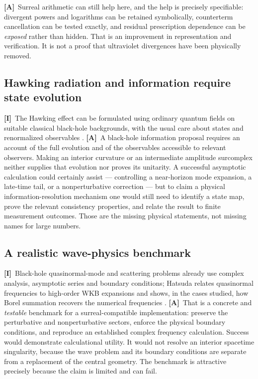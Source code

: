 \documentclass[11pt,letterpaper]{article}
\numberwithin{equation}{section}
\theoremstyle{definition}
\theoremstyle{remark}
\newcommand{\TA}{\textcolor{TierA}{\textsf{\bfseries[A]}}}
\newcommand{\TI}{\textcolor{TierI}{\textsf{\bfseries[I]}}}
\begin{document}
\TA\ Surreal arithmetic can still help here, and the help is precisely
specifiable: divergent powers and logarithms can be retained symbolically,
counterterm cancellation can be tested exactly, and residual prescription
dependence can be \emph{exposed} rather than hidden. That is an improvement in
representation and verification. It is not a proof that ultraviolet divergences
have been physically removed.

\subsection{Hawking radiation and information require state evolution}
\label{phys:sub:hawking}

\TI\ The Hawking effect can be formulated using ordinary quantum fields on
suitable classical black-hole backgrounds, with the usual care about states and
renormalized observables \cite{phys:HW}. \TA\ A black-hole information proposal
requires an account of the full evolution and of the observables accessible to
relevant observers. Making an interior curvature or an intermediate amplitude
surcomplex neither supplies that evolution nor proves its unitarity. A
successful asymptotic calculation could certainly assist --- controlling a
near-horizon mode expansion, a late-time tail, or a nonperturbative correction
--- but to claim a physical information-resolution mechanism one would still
need to identify a state map, prove the relevant consistency properties, and
relate the result to finite measurement outcomes. Those are the missing
physical statements, not missing names for large numbers.

\subsection{A realistic wave-physics benchmark}
\label{phys:sub:qnm}

\TI\ Black-hole quasinormal-mode and scattering problems already use complex
analysis, asymptotic series and boundary conditions; Hatsuda relates
quasinormal frequencies to high-order WKB expansions and shows, in the cases
studied, how Borel summation recovers the numerical frequencies
\cite{phys:Hatsuda}. \TA\ That is a concrete and \emph{testable} benchmark for
a surreal-compatible implementation: preserve the perturbative and
nonperturbative sectors, enforce the physical boundary conditions, and
reproduce an established complex frequency calculation. Success would
demonstrate calculational utility. It would not resolve an interior spacetime
singularity, because the wave problem and its boundary conditions are separate
from a replacement of the central geometry. The benchmark is attractive
precisely because the claim is limited and can fail.
\end{document}
